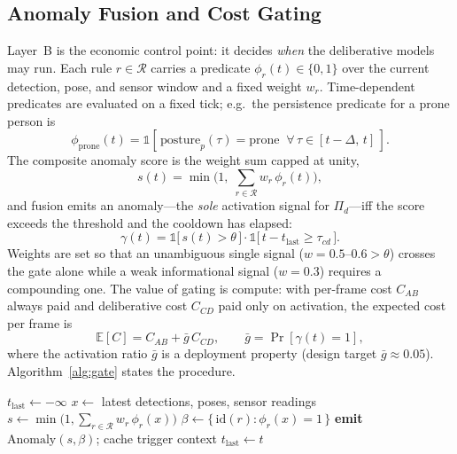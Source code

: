 \subsection{\textbf{Anomaly Fusion and Cost Gating}}
\label{sec:gate}
Layer~B is the economic control point: it decides \emph{when} the deliberative
models may run. Each rule $r\in\mathcal{R}$ carries a predicate $\phi_r(t)\in\{0,1\}$
over the current detection, pose, and sensor window and a fixed weight $w_r$.
Time-dependent predicates are evaluated on a fixed tick; e.g.\ the persistence
predicate for a prone person is
\begin{equation}
\phi_{\text{prone}}(t) = \mathbb{1}\!\left[\,\text{posture}_p(\tau)=\text{prone}
\;\;\forall\,\tau\in[t-\Delta,\,t]\,\right].
\label{eq:prone}
\end{equation}
The composite anomaly score is the weight sum capped at unity,
\begin{equation}
s(t) = \min\!\Big(1,\; \textstyle\sum_{r\in\mathcal{R}} w_r\,\phi_r(t)\Big),
\label{eq:score}
\end{equation}
and fusion emits an anomaly---the \emph{sole} activation signal for $\Pi_d$---iff
the score exceeds the threshold and the cooldown has elapsed:
\begin{equation}
\gamma(t) = \mathbb{1}\!\big[\,s(t) > \theta\,\big]\cdot
             \mathbb{1}\!\big[\,t - t_{\text{last}} \ge \tau_{cd}\,\big].
\label{eq:gate}
\end{equation}
Weights are set so that an unambiguous single signal
($w=0.5$--$0.6 > \theta$) crosses the gate alone while a weak informational signal
($w=0.3$) requires a compounding one. The value of gating is compute: with
per-frame cost $C_{AB}$ always paid and deliberative cost $C_{CD}$ paid only on
activation, the expected cost per frame is
\begin{equation}
\mathbb{E}[C] = C_{AB} + \bar g\,C_{CD}, \qquad \bar g = \Pr[\gamma(t)=1],
\label{eq:compute}
\end{equation}
where the activation ratio $\bar g$ is a deployment property (design target
$\bar g \approx 0.05$). Algorithm~\ref{alg:gate} states the procedure.

\begin{algorithm}[t]
\caption{Fusion gate (Layer~B)}
\label{alg:gate}
\begin{algorithmic}[1]
\State $t_{\text{last}} \gets -\infty$
\Loop {}
  \State $x \gets$ latest detections, poses, sensor readings
  \State $s \gets \min\!\big(1,\sum_{r\in\mathcal{R}} w_r\,\phi_r(x)\big)$
     \State $\beta \gets \{\,\text{id}(r) : \phi_r(x)=1\,\}$
     \State \textbf{emit} $\text{Anomaly}(s,\beta)$; cache trigger context
     \State $t_{\text{last}} \gets t$
  \EndIf
\EndLoop
\end{algorithmic}
\end{algorithm}


